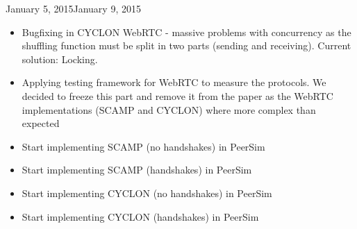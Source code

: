 \documentclass[11pt, english, screen]{report-rd-info}
\begin{document}
\begin{fichesuivi}{January 5, 2015}{January 9, 2015}

   \begin{travaileffectue}
   \begin{itemize}
   \item {Bugfixing in CYCLON WebRTC - massive problems with concurrency as the shuffling function must be split in two parts (sending and receiving). Current solution: Locking.}
      \end{itemize}
   \end{travaileffectue}

   \begin{travailnoneffectue}
   \begin{itemize}
   \item {Applying testing framework for WebRTC to measure the protocols. We decided to freeze this part and remove it from the paper as the WebRTC implementations (SCAMP and CYCLON) where more complex than expected }
      \end{itemize}
   \end{travailnoneffectue}

   \begin{echange}
   \end{echange}
\begin{itemize}
   \item {Start implementing SCAMP (no handshakes) in PeerSim}
   \item {Start implementing SCAMP (handshakes) in PeerSim}
   \item {Start implementing CYCLON (no handshakes) in PeerSim}
   \item {Start implementing CYCLON (handshakes) in PeerSim}
      \end{itemize}
   \begin{planification}

   \end{planification}
\end{fichesuivi}
\end{document}
